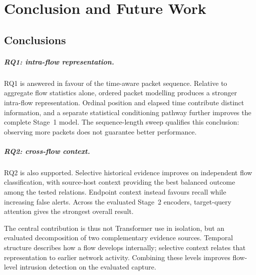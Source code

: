 \documentclass[11pt,fleqn]{report}
\begin{document}


\chapter{Conclusion and Future Work}
\label{sec:conclusion_future_work}

\section{Conclusions}
\label{subsec:conclusion_rq_answers}

\paragraph{RQ1: intra-flow representation.}
RQ1 is answered in favour of the time-aware packet sequence. Relative to aggregate flow statistics alone, ordered packet modelling produces a stronger intra-flow representation. Ordinal position and elapsed time contribute distinct information, and a separate statistical conditioning pathway further improves the complete Stage~1 model. The sequence-length sweep qualifies this conclusion: observing more packets does not guarantee better performance.

\paragraph{RQ2: cross-flow context.}
RQ2 is also supported. Selective historical evidence improves on independent flow classification, with source-host context providing the best balanced outcome among the tested relations. Endpoint context instead favours recall while increasing false alerts. Across the evaluated Stage~2 encoders, target-query attention gives the strongest overall result.

The central contribution is thus not Transformer use in isolation, but an evaluated decomposition of two complementary evidence sources. Temporal structure describes how a flow develops internally; selective context relates that representation to earlier network activity. Combining these levels improves flow-level intrusion detection on the evaluated capture.
\end{document}
